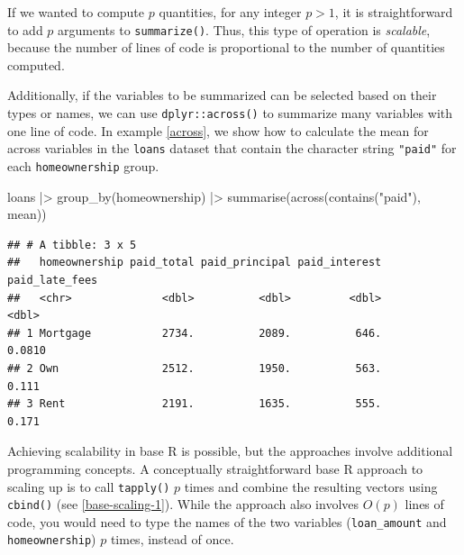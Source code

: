 \documentclass[12pt]{article}
\newenvironment{Shaded}{\begin{snugshade}}{\end{snugshade}}
\newcommand{\FunctionTok}[1]{\textcolor[rgb]{0.00,0.00,0.00}{#1}}
\newcommand{\NormalTok}[1]{#1}
\newcommand{\SpecialCharTok}[1]{\textcolor[rgb]{0.00,0.00,0.00}{#1}}
\newcommand{\StringTok}[1]{\textcolor[rgb]{0.31,0.60,0.02}{#1}}
\begin{document}
If we wanted to compute \(p\) quantities, for any integer \(p > 1\), it
is straightforward to add \(p\) arguments to \texttt{summarize()}. Thus,
this type of operation is \emph{scalable}, because the number of lines
of code is proportional to the number of quantities computed.

Additionally, if the variables to be summarized can be selected based on
their types or names, we can use \texttt{dplyr::across()} to summarize
many variables with one line of code. In example \ref{across}, we show
how to calculate the mean for across variables in the \texttt{loans}
dataset that contain the character string \texttt{"paid"} for each
\texttt{homeownership} group.

\linespread{1}

\begin{Shaded}
\begin{Highlighting}[]
\NormalTok{loans }\SpecialCharTok{|\textgreater{}} 
  \FunctionTok{group\_by}\NormalTok{(homeownership) }\SpecialCharTok{|\textgreater{}} 
  \FunctionTok{summarise}\NormalTok{(}\FunctionTok{across}\NormalTok{(}\FunctionTok{contains}\NormalTok{(}\StringTok{"paid"}\NormalTok{), mean))}
\end{Highlighting}
\end{Shaded}

\begin{verbatim}
## # A tibble: 3 x 5
##   homeownership paid_total paid_principal paid_interest paid_late_fees
##   <chr>              <dbl>          <dbl>         <dbl>          <dbl>
## 1 Mortgage           2734.          2089.          646.         0.0810
## 2 Own                2512.          1950.          563.         0.111 
## 3 Rent               2191.          1635.          555.         0.171
\end{verbatim}


\label{across} \linespread{2} \vspace{3mm}\setlength{\parindent}{15pt}

Achieving scalability in base R is possible, but the approaches involve
additional programming concepts. A conceptually straightforward base R
approach to scaling up is to call \texttt{tapply()} \(p\) times and
combine the resulting vectors using \texttt{cbind()} (see
\ref{base-scaling-1}). While the approach also involves \(O(p)\) lines
of code, you would need to type the names of the two variables
(\texttt{loan\_amount} and \texttt{homeownership}) \(p\) times, instead
of once.
\end{document}
